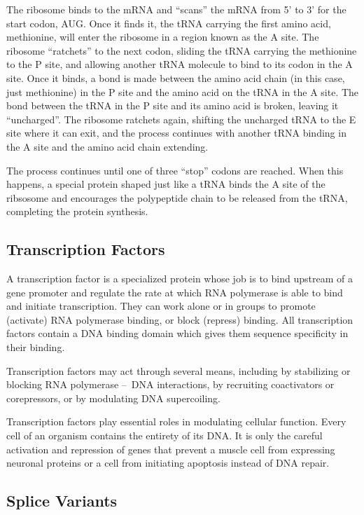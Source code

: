 The ribosome binds to the mRNA and ``scans'' the mRNA from 5' to 3' for the start codon, AUG. Once it finds it, the tRNA carrying the first amino acid, methionine, will enter the ribosome in a region known as the A site. The ribosome ``ratchets'' to the next codon, sliding the tRNA carrying the methionine to the P site, and allowing another tRNA molecule to bind to its codon in the A site. Once it binds, a bond is made between the amino acid chain (in this case, just methionine) in the P site and the amino acid on the tRNA in the A site. The bond between the tRNA in the P site and its amino acid is broken, leaving it ``uncharged''. The ribosome ratchets again, shifting the uncharged tRNA to the E site where it can exit, and the process continues with another tRNA binding in the A site and the amino acid chain extending.

The process continues until one of three ``stop'' codons are reached. When this happens, a special protein shaped just like a tRNA binds the A site of the ribsosome and encourages the polypeptide chain to be released from the tRNA, completing the protein synthesis.

\subsection{Transcription Factors}

A transcription factor is a specialized protein whose job is to bind upstream of a gene promoter and regulate the rate at which RNA polymerase is able to bind and initiate transcription. They can work alone or in groups to promote (activate) RNA polymerase binding, or block (repress) binding. All transcription factors contain a DNA binding domain which gives them sequence specificity in their binding.

Transcription factors may act through several means, including by stabilizing or blocking RNA polymerase – DNA interactions, by recruiting coactivators or corepressors, or by modulating DNA supercoiling.

Transcription factors play essential roles in modulating cellular function. Every cell of an organism contains the entirety of its DNA. It is only the careful activation and repression of genes that prevent a muscle cell from expressing neuronal proteins or a cell from initiating apoptosis instead of DNA repair.

\subsection{Splice Variants}

